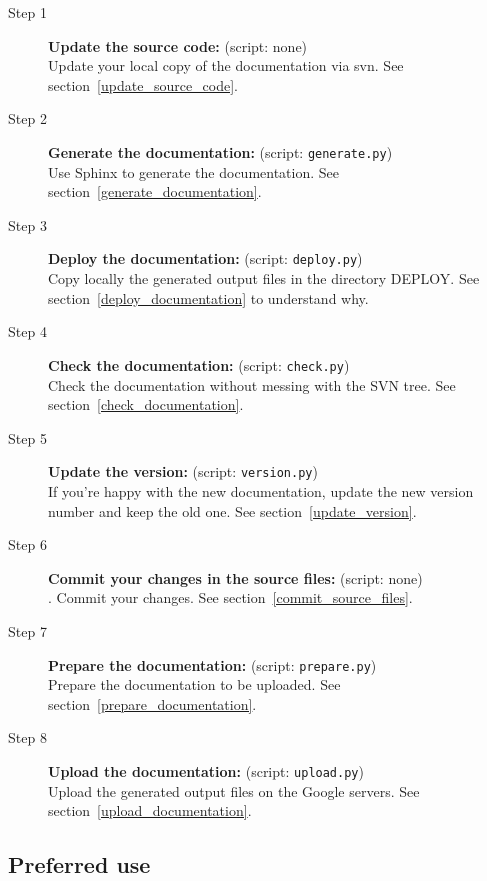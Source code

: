 \documentclass[a4paper,10pt]{article}
\newcommand{\code}[1]{\texttt{#1}}
\begin{document}
\begin{description}
 \item[Step 1] {\bf Update the source code:} (script: none)\\Update your local copy of the documentation via svn. See section~\ref{update_source_code}.
 \item[Step 2] {\bf Generate the documentation:} (script: \code{generate.py})\\Use Sphinx to generate the documentation. See section~\ref{generate_documentation}.
 \item[Step 3] {\bf Deploy the documentation:} (script: \code{deploy.py})\\Copy locally the generated output files in the directory DEPLOY. See section~\ref{deploy_documentation} to understand why.
 \item[Step 4] {\bf Check the documentation:} (script: \code{check.py})\\Check the documentation without messing with the SVN tree. See section~\ref{check_documentation}.
 \item[Step 5] {\bf Update the version:} (script: \code{version.py})\\If you're happy with the new documentation, update the new version number and keep the old one. See section~\ref{update_version}.
 \item[Step 6] {\bf Commit your changes in the source files:} (script: none)\\. Commit your changes. See section~\ref{commit_source_files}.
 \item[Step 7] {\bf Prepare the documentation:} (script: \code{prepare.py})\\Prepare the documentation to be uploaded. See section~\ref{prepare_documentation}.
 \item[Step 8] {\bf Upload the documentation:} (script: \code{upload.py})\\Upload the generated output files on the Google servers. See section~\ref{upload_documentation}.
\end{description}

\subsection{Preferred use}
\end{document}
